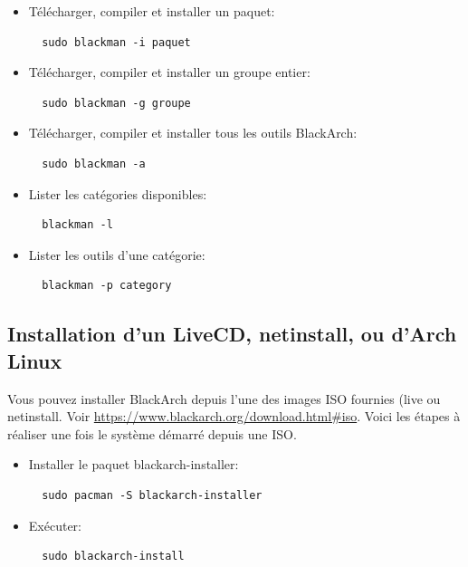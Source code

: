 \documentclass[a4paper, oneside, 11pt]{book}
\begin{document}
\begin{itemize}
\item T\'{e}l\'{e}charger, compiler et installer un paquet:
\begin{lstlisting}
  sudo blackman -i paquet
\end{lstlisting}

\item T\'{e}l\'{e}charger, compiler et installer un groupe entier:
\begin{lstlisting}
  sudo blackman -g groupe
\end{lstlisting}

\item T\'{e}l\'{e}charger, compiler et installer tous les outils BlackArch:
\begin{lstlisting}
  sudo blackman -a
\end{lstlisting}

\item Lister les cat\'{e}gories disponibles:
\begin{lstlisting}
  blackman -l
\end{lstlisting}

\item Lister les outils d'une cat\'{e}gorie:
\begin{lstlisting}
  blackman -p category
\end{lstlisting}

\end{itemize}

\subsection{Installation d'un LiveCD, netinstall, ou d'Arch Linux}
Vous pouvez installer BlackArch depuis l'une des images ISO fournies (live ou netinstall.
Voir \url{https://www.blackarch.org/download.html#iso}. Voici les \'{e}tapes \`{a} r\'{e}aliser une fois le syst\`{e}me d\'{e}marr\'{e} depuis une ISO.

\begin{itemize}
\item Installer le paquet blackarch-installer:
\begin{lstlisting}
  sudo pacman -S blackarch-installer
\end{lstlisting}

\item Ex\'{e}cuter:
\begin{lstlisting}
  sudo blackarch-install
\end{lstlisting}

\end{itemize}
\end{document}
